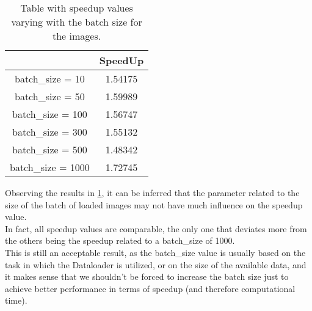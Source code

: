 \documentclass[10pt,twocolumn,letterpaper]{article}
\begin{document}
\begin{table}[h]
\centering
\begin{tabular}{ |c|c| } 
\hline
 & SpeedUp\\
 \hline
batch\_size = 10 & 1.54175\\
\hline
batch\_size = 50 & 1.59989\\
\hline
batch\_size = 100 & 1.56747\\
\hline
batch\_size = 300 & 1.55132\\
\hline
batch\_size = 500 & 1.48342\\
\hline
batch\_size = 1000 & 1.72745\\
\hline
\end{tabular}
\vspace*{3mm}
\caption{Table with speedup values varying with the batch size for the images.}
\label{table:t2}
\end{table}

Observing the results in \cref{table:t2}, it can be inferred that the parameter related to the size of the batch of loaded images may not have much influence on the speedup value.\\
In fact, all speedup values are comparable, the only one that deviates more from the others being the speedup related to a batch\_size of 1000.\\
This is still an acceptable result, as the batch\_size value is usually based on the task in which the Dataloader is utilized, or on the size of the available data, and it makes sense that we shouldn't be forced to increase the batch size just to achieve better performance in terms of speedup (and therefore computational time).
\end{document}
